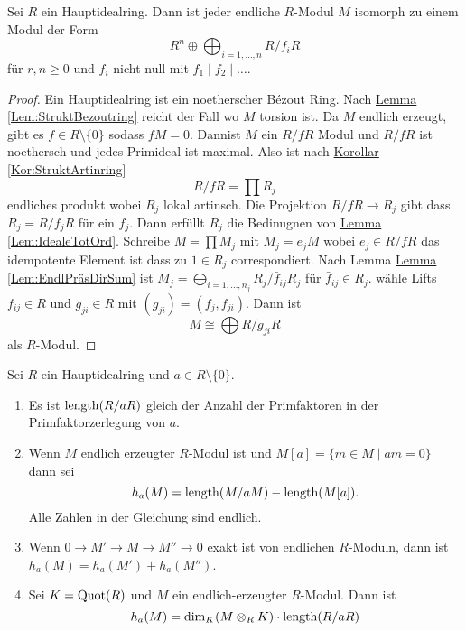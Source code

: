 \begin{Satz}\label{Satz:StruktEndlModPID}
Sei \(R\) ein Hauptidealring. Dann ist jeder endliche \(R\)-Modul \(M\) isomorph zu einem Modul der Form \[R^n\oplus\bigoplus_{i=1,\dots,n}R/f_iR\] für \(r,n\geq 0\) und \(f_i\) nicht-null mit \(f_1\mid f_2\mid\dots\).
    
\end{Satz}
\begin{proof}
    Ein Hauptidealring ist ein noetherscher Bézout Ring. Nach \hyperref[Lem:StruktBezoutring]{Lemma \ref{Lem:StruktBezoutring}} reicht der Fall wo \(M\) torsion ist. Da \(M\) endlich erzeugt, gibt es \(f\in R\setminus\{0\}\) sodass \(fM=0\). Dannist \(M\) ein \(R/fR\) Modul und \(R/fR\) ist noethersch und jedes Primideal ist maximal. Also ist  nach \hyperref[Kor:StruktArtinring]{Korollar \ref{Kor:StruktArtinring}} \[R/fR=\prod R_j\] endliches produkt wobei \(R_j\) lokal artinsch. Die Projektion \(R/fR\to R_j\) gibt dass \(R_j=R/f_jR\) für ein \(f_j\). Dann erfüllt \(R_j\) die Bedinugnen von \hyperref[Lem:IdealeTotOrd]{Lemma \ref{Lem:IdealeTotOrd}}. Schreibe \(M=\prod M_j\) mit \(M_j=e_jM\) wobei \(e_j\in R/fR\) das idempotente Element ist dass zu \(1\in R_j\) correspondiert.  Nach Lemma \hyperref[Lem:EndlPräsDirSum]{Lemma \ref{Lem:EndlPräsDirSum}} ist \(M_j=\bigoplus_{i=1,\dots,n_j}R_j/\bar f_{ij}R_j\) für \(\bar f_{ij}\in R_j\). wähle Lifts \(f_{ij}\in R\) und \(g_{ji}\in R\) mit \((g_{ji})=(f_j,f_{ji})\). Dann ist \[M\cong\bigoplus R/g_{ji}R\] als \(R\)-Modul.
\end{proof}
\begin{Lemma}
    Sei \(R\) ein Hauptidealring und \(a\in R\setminus\{0\}\).
    \begin{enumerate}
        \item Es ist \(\operatorname{length}(R/aR)\) gleich der Anzahl der Primfaktoren in der Primfaktorzerlegung von \(a\).
        \item Wenn \(M\) endlich erzeugter \(R\)-Modul ist und \(M[a]=\{m\in M\mid am=0\}\) dann sei \[h_a(M)=\operatorname{length}(M/aM)-\operatorname{length}(M[a]).\] Alle Zahlen in der Gleichung sind endlich.
        \item Wenn \(0\to M'\to M\to M''\to 0\) exakt ist von endlichen \(R\)-Moduln, dann ist \(h_a(M)=h_a(M')+h_a(M'')\).
        \item Sei \(K=\operatorname{Quot}(R)\) und \(M\) ein endlich-erzeugter \(R\)-Modul. Dann ist 
        \[h_a(M)=\dim_K(M\otimes_RK)\cdot\operatorname{length}(R/aR)\]
    \end{enumerate}
\end{Lemma}
